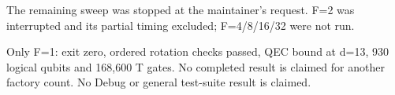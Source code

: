 The remaining sweep was stopped at the maintainer's request. F=2 was
interrupted and its partial timing excluded; F=4/8/16/32 were not run.

Only F=1: exit zero, ordered rotation checks passed, QEC bound at d=13,
930 logical qubits and 168{,}600 T gates. No completed result is claimed for
another factory count. No Debug or general test-suite result is claimed.
